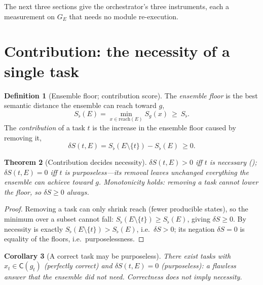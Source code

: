 \documentclass[twocolumn,11pt,a4paper]{article}
\theoremstyle{sup}
\newtheorem{theorem}{Theorem}[section]
\newtheorem{corollary}[theorem]{Corollary}
\theoremstyle{definition}
\newtheorem{definition}[theorem]{Definition}
\theoremstyle{remark}
\newcommand{\reach}{\mathrm{reach}}   %
\newcommand{\Sent}{S}                 %
\newcommand{\Sflat}{S_{\flat}}        %
\newcommand{\cell}{\mathsf{C}}        %
\newcommand{\task}{t}
\newcommand{\Ens}{E}                  %
\newcommand{\contrib}{\delta\Sent}    %
\newcommand{\set}[1]{\{#1\}}
\begin{document}
The next three sections give the orchestrator's three instruments, each a
measurement on $G_\Ens$ that needs no module re-execution.

\section{Contribution: the necessity of a single task}
\label{sec:contribution}

\begin{definition}[Ensemble floor; contribution score]
\label{def:contribution}
The \emph{ensemble floor} is the best semantic distance the ensemble can reach
toward $g$,
\[
\Sflat(\Ens)=\min_{x\in\reach(\Ens)}\Sent_g(x)\ \ge\ \Sflat .
\]
The \emph{contribution} of a task $\task$ is the increase in the ensemble floor
caused by removing it,
\[
\contrib(\task,\Ens)=\Sflat(\Ens\setminus\set\task)-\Sflat(\Ens)\ \ge 0 .
\]
\end{definition}

\begin{theorem}[Contribution decides necessity]
\label{thm:contribution}
$\contrib(\task,\Ens)>0$ iff $\task$ is necessary
(); $\contrib(\task,\Ens)=0$ iff $\task$ is
\emph{purposeless}---its removal leaves unchanged everything the ensemble can
achieve toward $g$. Monotonicity holds: removing a task cannot lower the floor,
so $\contrib\ge0$ always.
\end{theorem}

\begin{proof}
Removing a task can only shrink $\reach$ (fewer producible states), so the minimum
over a subset cannot fall: $\Sflat(\Ens\setminus\set\task)\ge\Sflat(\Ens)$, giving
$\contrib\ge0$. By  necessity is exactly
$\Sflat(\Ens\setminus\set\task)>\Sflat(\Ens)$, i.e.\ $\contrib>0$; its negation
$\contrib=0$ is equality of the floors, i.e.\ purposelessness.
\end{proof}

\begin{corollary}[A correct task may be purposeless]
\label{cor:correct-purposeless}
There exist tasks with $x_\task\in\cell(g_\task)$ (perfectly correct) and
$\contrib(\task,\Ens)=0$ (purposeless): a flawless answer that the ensemble did
not need. Correctness does not imply necessity.
\end{corollary}
\end{document}
